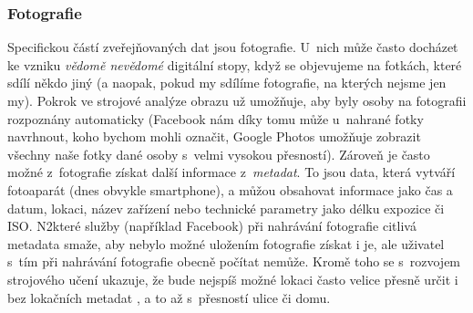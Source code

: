 \subsubsection*{Fotografie}
Specifickou částí zveřejňovaných dat jsou fotografie. U~nich může často docházet ke vzniku \textit{vědomě nevědomé} digitální stopy, když se objevujeme na fotkách, které sdílí někdo jiný (a naopak, pokud my sdílíme fotografie, na kterých nejsme jen my).
Pokrok ve strojové analýze obrazu už umožňuje, aby byly osoby na fotografii rozpoznány automaticky (Facebook nám díky tomu může u~nahrané fotky navrhnout, koho bychom mohli označit, Google Photos umožňuje zobrazit všechny naše fotky dané osoby s~velmi vysokou přesností).
Zároveň je často možné z~fotografie získat další informace z~\textit{metadat}. To jsou data, která vytváří fotoaparát (dnes obvykle smartphone), a můžou obsahovat informace jako čas a datum, lokaci, název zařízení nebo technické parametry jako délku expozice či ISO. N2které služby (například Facebook) při nahrávání fotografie citlivá metadata smaže, aby nebylo možné uložením fotografie získat i je, ale uživatel s~tím při nahrávání fotografie obecně počítat nemůže.
Kromě toho se s~rozvojem strojového učení ukazuje, že bude nejspíš možné lokaci často velice přesně určit i bez lokačních metadat \citep{ai-photo-location}, a to až s~přesností ulice či domu. 

